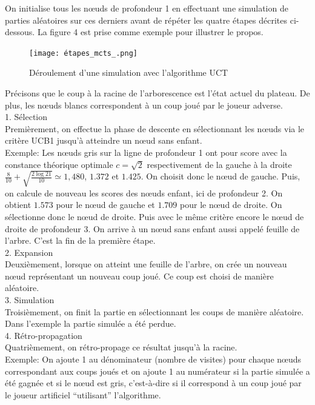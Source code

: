 \documentclass[a4paper]{article}
\theoremstyle{definition}
\begin{document}
On initialise tous les nœuds de profondeur 1 en effectuant une simulation de parties aléatoires sur ces derniers avant de répéter les quatre étapes décrites ci-dessous. La figure 4 est prise comme exemple pour illustrer le propos.

\begin{figure}[h]
\centering
\texttt{[image: étapes\_mcts\_.png]}
\caption{Déroulement d'une simulation avec l'algorithme UCT}
\label{fig:uct}
\end{figure}

Précisons que le coup à la racine de l'arborescence est l'état actuel du plateau. De plus, les nœuds blancs correspondent à un coup joué par le joueur adverse.\\

1. Sélection\\
Premièrement, on effectue la phase de descente en sélectionnant les nœuds via le critère UCB1 jusqu'à atteindre un nœud sans enfant.\\
Exemple: Les nœuds gris sur la ligne de profondeur 1 ont pour score avec la constance théorique optimale $c=\sqrt{2}$ respectivement de la gauche à la droite $\frac{8}{10} + \sqrt{\frac{2\log21}{10}} \simeq 1,480$, $1.372$ et $1.425$. On choisit donc le nœud de gauche. Puis, on calcule de nouveau les scores des nœuds enfant, ici de profondeur 2. On obtient $1.573$ pour le nœud de gauche et $1.709$ pour le nœud de droite. On sélectionne donc le nœud de droite. Puis avec le même critère encore le nœud de droite de profondeur 3. On arrive à un nœud sans enfant aussi appelé feuille de l'arbre. C'est la fin de la première étape.
\\

2. Expansion\\
Deuxièmement, lorsque on atteint une feuille de l'arbre, on crée un nouveau nœud représentant un nouveau coup joué. Ce coup est choisi de manière aléatoire.\\

3. Simulation\\
Troisièmement, on finit la partie en sélectionnant les coups de manière aléatoire. Dans l'exemple la partie simulée a été perdue.\\

4. Rétro-propagation\\
Quatrièmement, on rétro-propage ce résultat jusqu'à la racine.\\
Exemple: On ajoute 1 au dénominateur (nombre de visites) pour chaque nœuds correspondant aux coups joués et on ajoute 1 au numérateur si la partie simulée a été gagnée et si le nœud est gris, c'est-à-dire si il correspond à un coup joué par le joueur artificiel ``utilisant'' l'algorithme.
\end{document}
